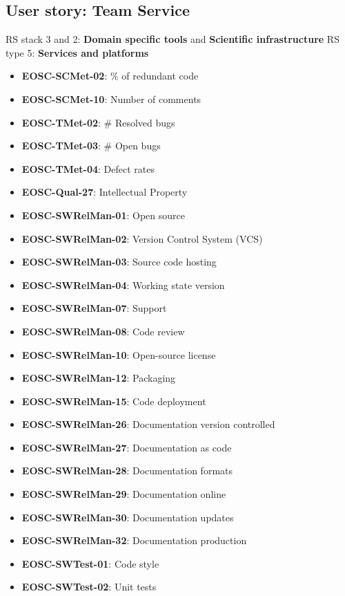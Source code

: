 \subsection{User story: Team Service}

RS stack 3 and 2: \textbf{Domain specific tools} and \textbf{Scientific infrastructure} \newline
RS type 5: \textbf{Services and platforms}

\begin{itemize}
    \item \textbf{EOSC-SCMet-02}: \% of redundant code
    \item \textbf{EOSC-SCMet-10}: Number of comments
    \item \textbf{EOSC-TMet-02}: \# Resolved bugs
    \item \textbf{EOSC-TMet-03}: \# Open bugs
    \item \textbf{EOSC-TMet-04}: Defect rates
    \item \textbf{EOSC-Qual-27}: Intellectual Property
    \item \textbf{EOSC-SWRelMan-01}: Open source
    \item \textbf{EOSC-SWRelMan-02}: Version Control System (VCS)
    \item \textbf{EOSC-SWRelMan-03}: Source code hosting
    \item \textbf{EOSC-SWRelMan-04}: Working state version
    \item \textbf{EOSC-SWRelMan-07}: Support
    \item \textbf{EOSC-SWRelMan-08}: Code review
    \item \textbf{EOSC-SWRelMan-10}: Open-source license
    \item \textbf{EOSC-SWRelMan-12}: Packaging
    \item \textbf{EOSC-SWRelMan-15}: Code deployment
    \item \textbf{EOSC-SWRelMan-26}: Documentation version controlled
    \item \textbf{EOSC-SWRelMan-27}: Documentation as code
    \item \textbf{EOSC-SWRelMan-28}: Documentation formats
    \item \textbf{EOSC-SWRelMan-29}: Documentation online
    \item \textbf{EOSC-SWRelMan-30}: Documentation updates
    \item \textbf{EOSC-SWRelMan-32}: Documentation production
    \item \textbf{EOSC-SWTest-01}: Code style
    \item \textbf{EOSC-SWTest-02}: Unit tests

\end{itemize}
